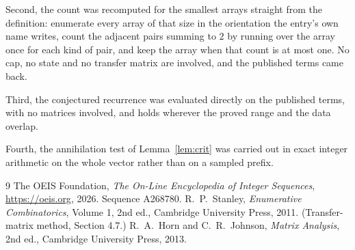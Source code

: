 \documentclass[11pt,a4paper]{article}
\theoremstyle{plain}
\theoremstyle{definition}
\begin{document}
Second, the count was recomputed for the smallest arrays straight from the definition:
enumerate every array of that size in the orientation the entry's own name writes, count the
adjacent pairs summing to $2$ by running over the array once for each kind of pair, and keep
the array when that count is at most one. No cap, no state and no transfer matrix are involved, and
the published terms came back.

Third, the conjectured recurrence was evaluated directly on the published terms, with no
matrices involved, and holds wherever the proved range and the data overlap.

Fourth, the annihilation test of Lemma~\ref{lem:crit} was carried out in exact integer
arithmetic on the whole vector rather than on a sampled prefix.

\begin{thebibliography}{9}
 The OEIS Foundation, \emph{The On-Line Encyclopedia of Integer
Sequences}, \url{https://oeis.org}, 2026. Sequence A268780.
 R.~P.~Stanley, \emph{Enumerative Combinatorics}, Volume 1, 2nd ed.,
Cambridge University Press, 2011. (Transfer-matrix method, Section 4.7.)
 R.~A.~Horn and C.~R.~Johnson, \emph{Matrix Analysis}, 2nd ed., Cambridge
University Press, 2013.
\end{thebibliography}
\end{document}
